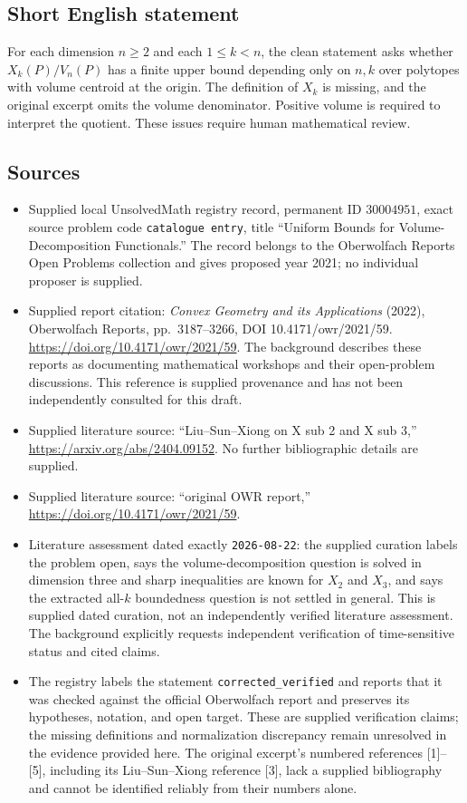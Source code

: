 \documentclass[11pt]{article}
\begin{document}
\subsection{Short English statement}
For each dimension \(n\geq2\) and each \(1\leq k<n\), the clean statement asks whether \(X_k(P)/V_n(P)\) has a finite upper bound depending only on \(n,k\) over polytopes with volume centroid at the origin. The definition of \(X_k\) is missing, and the original excerpt omits the volume denominator. Positive volume is required to interpret the quotient. These issues require human mathematical review.
\subsection{Sources}
\begin{itemize}
\item Supplied local UnsolvedMath registry record, permanent ID \(30004951\), exact source problem code \texttt{catalogue entry}, title ``Uniform Bounds for Volume-Decomposition Functionals.'' The record belongs to the Oberwolfach Reports Open Problems collection and gives proposed year 2021; no individual proposer is supplied.
\item Supplied report citation: \emph{Convex Geometry and its Applications} (2022), Oberwolfach Reports, pp.\ 3187--3266, DOI 10.4171/owr/2021/59. \url{https://doi.org/10.4171/owr/2021/59}. The background describes these reports as documenting mathematical workshops and their open-problem discussions. This reference is supplied provenance and has not been independently consulted for this draft.
\item Supplied literature source: ``Liu--Sun--Xiong on X sub 2 and X sub 3,'' \url{https://arxiv.org/abs/2404.09152}. No further bibliographic details are supplied.
\item Supplied literature source: ``original OWR report,'' \url{https://doi.org/10.4171/owr/2021/59}.
\item Literature assessment dated exactly \texttt{2026-08-22}: the supplied curation labels the problem open, says the volume-decomposition question is solved in dimension three and sharp inequalities are known for \(X_2\) and \(X_3\), and says the extracted all-\(k\) boundedness question is not settled in general. This is supplied dated curation, not an independently verified literature assessment. The background explicitly requests independent verification of time-sensitive status and cited claims.
\item The registry labels the statement \texttt{corrected\_verified} and reports that it was checked against the official Oberwolfach report and preserves its hypotheses, notation, and open target. These are supplied verification claims; the missing definitions and normalization discrepancy remain unresolved in the evidence provided here. The original excerpt's numbered references [1]--[5], including its Liu--Sun--Xiong reference [3], lack a supplied bibliography and cannot be identified reliably from their numbers alone.
\end{itemize}
\end{document}
